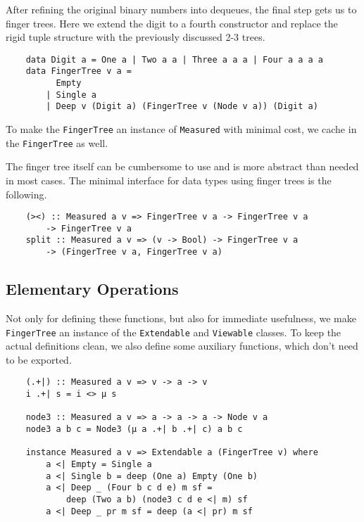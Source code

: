 After refining the original binary numbers into dequeues, the final step gets us to finger trees. Here we extend the digit to a fourth constructor and replace the rigid tuple structure with the previously discussed 2-3 trees.

\begin{verbatim}
    data Digit a = One a | Two a a | Three a a a | Four a a a a
    data FingerTree v a =
          Empty
        | Single a
        | Deep v (Digit a) (FingerTree v (Node v a)) (Digit a)
\end{verbatim}

To make the \texttt{FingerTree} an instance of \texttt{Measured} with minimal cost, we cache in the \texttt{FingerTree} as well.\par
The finger tree itself can be cumbersome to use and is more abstract than needed in most cases. The minimal interface for data types using finger trees is the following.

\begin{verbatim}
    (><) :: Measured a v => FingerTree v a -> FingerTree v a
        -> FingerTree v a
    split :: Measured a v => (v -> Bool) -> FingerTree v a
        -> (FingerTree v a, FingerTree v a)
\end{verbatim}

\subsection{Elementary Operations}

Not only for defining these functions, but also for immediate usefulness, we make \texttt{FingerTree} an instance of the \texttt{Extendable} and \texttt{Viewable} classes. To keep the actual definitions clean, we also define some auxiliary functions, which don't need to be exported.

\begin{verbatim}
    (.+|) :: Measured a v => v -> a -> v
    i .+| s = i <> μ s

    node3 :: Measured a v => a -> a -> a -> Node v a
    node3 a b c = Node3 (μ a .+| b .+| c) a b c

    instance Measured a v => Extendable a (FingerTree v) where
        a <| Empty = Single a
        a <| Single b = deep (One a) Empty (One b)
        a <| Deep _ (Four b c d e) m sf =
            deep (Two a b) (node3 c d e <| m) sf
        a <| Deep _ pr m sf = deep (a <| pr) m sf
\end{verbatim}

